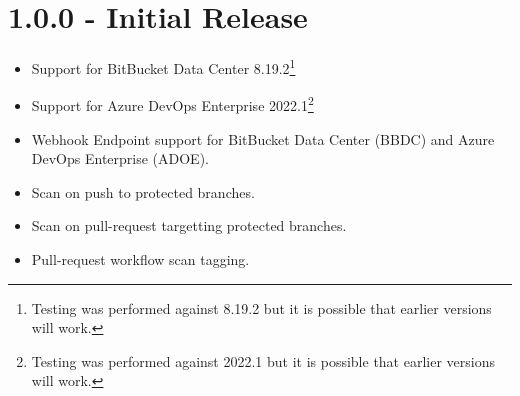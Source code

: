 \section{1.0.0 - Initial Release}
    \begin{itemize}
        \item Support for BitBucket Data Center 8.19.2\footnote{Testing was performed against 8.19.2 but it is possible that earlier versions will work.}
        \item Support for Azure DevOps Enterprise 2022.1\footnote{Testing was performed against 2022.1 but it is possible that earlier versions will work.}
        \item Webhook Endpoint support for BitBucket Data Center (BBDC) and Azure DevOps Enterprise (ADOE).
        \item Scan on push to protected branches.
        \item Scan on pull-request targetting protected branches.
        \item Pull-request workflow scan tagging.
    \end{itemize}